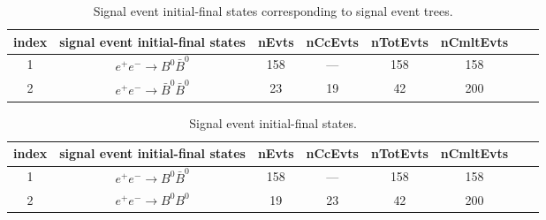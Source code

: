 \documentclass[landscape]{article}
\begin{document}
\clearpage

\begin{table}[htbp!]
\caption{Signal event initial-final states corresponding to signal event trees.}
\small
\centering
\begin{tabular}{|c|c|c|c|c|c|c|c|}
\hline
index & signal event initial-final states & nEvts & nCcEvts & nTotEvts & nCmltEvts \\
\hline
1 & $ e^{+} e^{-} \rightarrow B^{0} \bar{B}^{0} $ & 158 & --- & 158 & 158 \\
\hline
2 & $ e^{+} e^{-} \rightarrow \bar{B}^{0} \bar{B}^{0} $ & 23 & 19 & 42 & 200 \\
\hline
\end{tabular}
\end{table}

\clearpage

\begin{table}[htbp!]
\caption{Signal event initial-final states.}
\small
\centering
\begin{tabular}{|c|c|c|c|c|c|c|c|}
\hline
index & signal event initial-final states & nEvts & nCcEvts & nTotEvts & nCmltEvts \\
\hline
1 & $ e^{+} e^{-} \rightarrow B^{0} \bar{B}^{0} $ & 158 & --- & 158 & 158 \\
\hline
2 & $ e^{+} e^{-} \rightarrow B^{0} B^{0} $ & 19 & 23 & 42 & 200 \\
\hline
\end{tabular}
\end{table}
\end{document}
